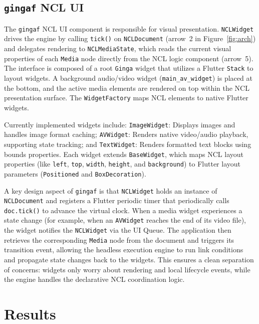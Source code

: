 \documentclass[sigconf,authorversion,review,authordraft]{acmart}
\newcommand{\projectname}{\texttt{gingaf}}
\begin{document}
\subsection{\projectname{} NCL UI}
\label{sec:nclui}

The \projectname{} NCL UI component is responsible for visual presentation. \texttt{NCLWidget} drives the engine by calling \texttt{tick()} on \texttt{NCLDocument} (arrow~2 in Figure~\ref{fig:arch}) and delegates rendering to \texttt{NCLMediaState}, which reads the current visual properties of each \texttt{Media} node directly from the NCL logic component (arrow~5). The interface is composed of a root \texttt{Ginga} widget that utilizes a Flutter \texttt{Stack} to layout widgets. A background audio/video widget (\texttt{main\_av\_widget}) is placed at the bottom, and the active media elements are rendered on top within the NCL presentation surface. The \texttt{WidgetFactory} maps NCL elements to native Flutter widgets.

Currently implemented widgets include: \texttt{ImageWidget}: Displays images and handles image format caching; \texttt{AVWidget}: Renders native video/audio playback, supporting state tracking; and \texttt{TextWidget}: Renders formatted text blocks using bounds properties. Each widget extends \texttt{BaseWidget}, which maps NCL layout properties (like \texttt{left}, \texttt{top}, \texttt{width}, \texttt{height}, and \texttt{background}) to Flutter layout parameters (\texttt{Positioned} and \texttt{BoxDecoration}).

A key design aspect of \projectname{} is that \texttt{NCLWidget} holds an instance of \texttt{NCLDocument} and registers a Flutter periodic timer that periodically calls \texttt{doc.tick()} to advance the virtual clock. When a media widget experiences a state change (for example, when an \texttt{AVWidget} reaches the end of its video file), the widget notifies the \texttt{NCLWidget} via the UI Queue. The application then retrieves the corresponding \texttt{Media} node from the document and triggers its transition event, allowing the headless execution engine to run link conditions and propagate state changes back to the widgets. This ensures a clean separation of concerns: widgets only worry about rendering and local lifecycle events, while the engine handles the declarative NCL coordination logic.

\section{Results}
\end{document}

